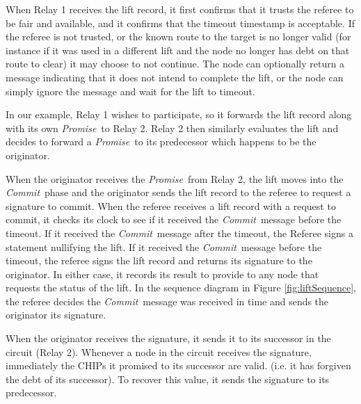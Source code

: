 \documentclass[runningheads]{llncs}
\newcommand{\promise}{\emph{Promise}}
\newcommand{\commit}{\emph{Commit}}
\newcommand{\figref}[1]{Figure \ref{#1}}
\newcommand{\spin}{Spin}
\newif\ifcomments
\newif\ifkylecomments
\newcommand{\egm}[1]{\ifcomments\textcolor{orange}{egm: #1}\fi}
\newcommand{\krs}[1]{\ifkylecomments\textcolor{blue}{krs: #1}\fi}
\begin{document}
When Relay 1 receives the lift record, it first confirms that it trusts the referee to be fair and available, and it confirms that the timeout timestamp is acceptable. If the referee is not trusted, or the known route to the target is no longer valid (for instance if it was used in a different lift and the node no longer has debt on that route to clear) it may choose to not continue. The node can optionally return a message indicating that it does not intend to complete the lift, or the node can simply ignore the message and wait for the lift to timeout. 
\krs{ Sounds good. This was just a one-off sentence and I removed it, note to self: find an appropriate place to put that. \egm{Move the following section to the section that describes the model checker model. Let's not mix the general protocol description with how we chose to model it in \spin.}}
\krs{
I'm pretty verbose here but folks that understand the protocol can just skip this, folks who don't get it might appreciate the detail}
In our example, Relay 1 wishes to participate, so it forwards the lift record along with its own \promise\ to Relay 2. Relay 2 then similarly evaluates the lift and decides to forward a \promise\ to its predecessor which happens to be the originator. 

When the originator receives the \promise\ from Relay 2, the lift moves into the \commit\ phase and the originator sends the lift record to the referee to request a signature to commit. When the referee receives a lift record with a request to commit, it checks its clock to see if it received the \commit\ message before the timeout. If it received the \commit\ message after the timeout, the Referee signs a statement nullifying the lift. If it received the \commit\ message before the timeout, the referee signs the lift record and returns its signature to the originator. In either case, it records its result to provide to any node that requests the status of the lift. In the sequence diagram in \figref{fig:liftSequence}, the referee decides the \commit\ message was received in time and sends the originator its signature.

When the originator receives the signature, it sends it to its successor in the circuit (Relay 2). Whenever a node in the circuit receives the signature, immediately the CHIPs it promised to its successor are valid. (i.e. it has forgiven the debt of its successor). 
To recover this value, it sends the signature to its predecessor.
\end{document}
